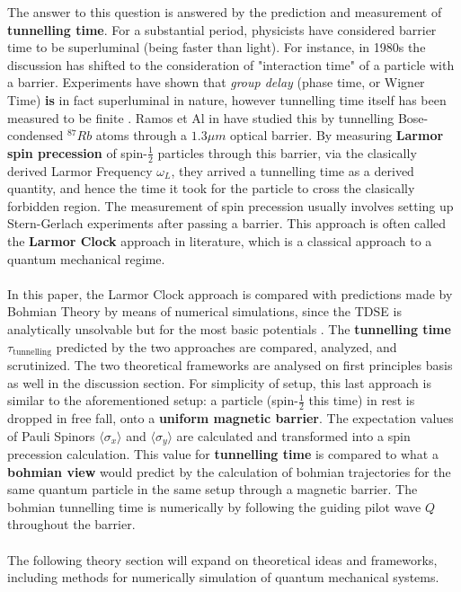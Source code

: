 The answer to this question is answered by the prediction and measurement of \textbf{tunnelling time}. For a substantial period, physicists have considered barrier time to be superluminal (being faster than light). For instance, in 1980s the discussion has shifted to the consideration of "interaction time" of a particle with a barrier. Experiments have shown that \textit{group delay} (phase time, or Wigner Time) \textbf{is} in fact superluminal in nature, however tunnelling time itself has been measured to be finite \cite{paper:tunneling_atom}. Ramos et Al in \cite{paper:tunneling_atom} have studied this by tunnelling Bose-condensed $^{87}Rb$ atoms through a $1.3 \mu m$ optical barrier. By measuring \textbf{Larmor spin precession} of spin-$\frac{1}{2}$ particles through this barrier, via the clasically derived Larmor Frequency $\omega_L$, they arrived a tunnelling time as a derived quantity, and hence the time it took for the particle to cross the clasically forbidden region. The measurement of spin precession usually involves setting up Stern-Gerlach experiments after passing a barrier. This approach is often called the \textbf{Larmor Clock} approach in literature, which is a classical approach to a quantum mechanical regime.
\\\\
In this paper, the Larmor Clock approach is compared with predictions made by Bohmian Theory by means of numerical simulations, since the TDSE is analytically unsolvable but for the most basic potentials \cite{book:cohen_qm} \cite{book:griffiths_qm}. The \textbf{tunnelling time $\tau_\text{tunnelling}$} predicted by the two approaches are compared, analyzed, and scrutinized. The two theoretical frameworks are analysed on first principles basis as well in the discussion section. For simplicity of setup, this last approach is similar to the aforementioned setup: a particle (spin-$\frac{1}{2}$ this time) in rest is dropped in free fall, onto a \textbf{uniform magnetic barrier}. The expectation values of Pauli Spinors $\langle\sigma_x\rangle$ and $\langle\sigma_y\rangle$ are calculated and transformed into a spin precession calculation. This value for \textbf{tunnelling time} is compared to what a \textbf{bohmian view} would predict by the calculation of bohmian trajectories for the same quantum particle in the same setup through a magnetic barrier. The bohmian tunnelling time is numerically by following the guiding pilot wave $Q$ throughout the barrier.
\\\\
The following theory section will expand on theoretical ideas and frameworks, including methods for numerically simulation of quantum mechanical systems.

